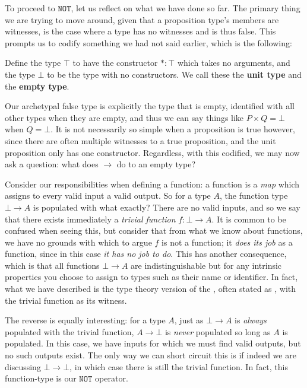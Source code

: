 \documentclass[11pt]{article}
\begin{document}
To proceed to $\mathtt{NOT}$, let us reflect on what we have done so far. The primary thing we are trying to move around, given that a proposition type's members are witnesses, is the case where a type has no witnesses and is thus false. This prompts us to codify something we had not said earlier, which is the following:

\begin{definition}
Define the type $\top$ to have the constructor $* \colon \top$ which takes no arguments, and the type $\bot$ to be the type with no constructors. We call these the \textbf{unit type} and the \textbf{empty type}.
\end{definition}

Our archetypal false type is explicitly the type that is empty, identified with all other types when they are empty, and thus we can say things like $P \times Q = \bot$ when $Q = \bot$. It is not necessarily so simple when a proposition is true however, since there are often multiple witnesses to a true proposition, and the unit proposition only has one constructor. Regardless, with this codified, we may now ask a question: what does $\to$ do to an empty type?

Consider our responsibilities when defining a function: a function is a \emph{map} which assigns to every valid input a valid output. So for a type $A$, the function type $\bot \to A$ is populated with what exactly? There are no valid inputs, and so we say that there exists immediately a \emph{trivial function} $f \colon \bot \to A$. It is common to be confused when seeing this, but consider that from what we know about functions, we have no grounds with which to argue $f$ is not a function; it \emph{does its job} as a function, since in this case \emph{it has no job to do}. This has another consequence, which is that all functions $\bot \to A$ are indistinguishable but for any intrinsic properties you choose to assign to types such as their name or identifier. In fact, what we have described is the type theory version of the , often stated as , with the trivial function as its witness.

The reverse is equally interesting: for a type $A$, just as $\bot \to A$ is \emph{always} populated with the trivial function, $A \to \bot$ is \emph{never} populated so long as $A$ is populated. In this case, we have inputs for which we must find valid outputs, but no such outputs exist. The only way we can short circuit this is if indeed we are discussing $\bot \to \bot$, in which case there is still the trivial function. In fact, this function-type is our $\mathtt{NOT}$ operator.
\end{document}

